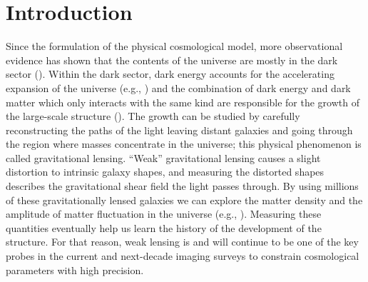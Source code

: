\documentclass[fleqn,usenatbib]{mnras}
\begin{document}


\section{Introduction}

Since the formulation of the physical cosmological model, more observational evidence has shown that the contents of the universe are mostly in the dark sector (\citealt{2020A&A...633A..69H, 2018PhRvD..98d3528T, 2019PhRvL.122q1301A, 2019PASJ...71...43H, 2021A&A...645A.104A}). Within the dark sector, dark energy accounts for the accelerating expansion of the universe (e.g., \citealt{1998AJ....116.1009R, 1999AIPC..478..129P}) and the combination of dark energy and dark matter which only interacts with the same kind are responsible for the growth of the large-scale structure (\citealt{2015RPPh...78h6901K, 2017grle.book.....D}). The growth can be studied by carefully reconstructing the paths of the light leaving distant galaxies and going through the region where masses concentrate in the universe; this physical phenomenon is called gravitational lensing. “Weak” gravitational lensing causes a slight distortion to intrinsic galaxy shapes, and measuring the distorted shapes describes the gravitational shear field the light passes through. By using millions of these gravitationally lensed galaxies we can explore the matter density and the amplitude of matter fluctuation in the universe (e.g., \citealt{2001PhR...340..291B}). Measuring these quantities eventually help us learn the history of the development of the structure. For that reason, weak lensing is and will continue to be one of the key probes in the current and next-decade imaging surveys to constrain cosmological parameters with high precision. \par
\end{document}
